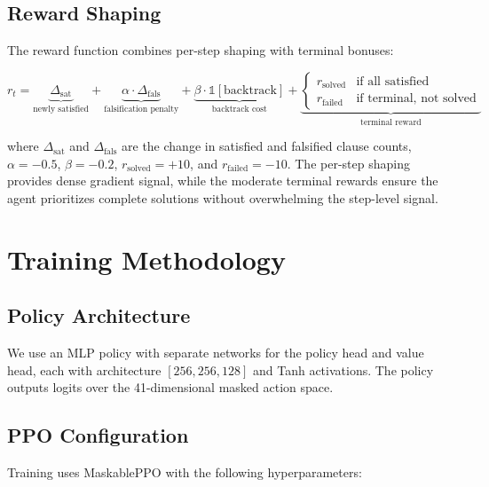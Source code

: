 \documentclass{article}
\begin{document}
\subsection{Reward Shaping}
\label{sec:rewards}

The reward function combines per-step shaping with terminal bonuses:

\begin{equation}
r_t = \underbrace{\Delta_{\text{sat}}}_{\text{newly satisfied}} + \underbrace{\alpha \cdot \Delta_{\text{fals}}}_{\text{falsification penalty}} + \underbrace{\beta \cdot \mathbb{1}[\text{backtrack}]}_{\text{backtrack cost}} + \underbrace{\begin{cases} r_{\text{solved}} & \text{if all satisfied} \\ r_{\text{failed}} & \text{if terminal, not solved} \end{cases}}_{\text{terminal reward}}
\end{equation}

where $\Delta_{\text{sat}}$ and $\Delta_{\text{fals}}$ are the change in satisfied and falsified clause counts, $\alpha = -0.5$, $\beta = -0.2$, $r_{\text{solved}} = +10$, and $r_{\text{failed}} = -10$. The per-step shaping provides dense gradient signal, while the moderate terminal rewards ensure the agent prioritizes complete solutions without overwhelming the step-level signal.

\section{Training Methodology}

\subsection{Policy Architecture}

We use an MLP policy with separate networks for the policy head and value head, each with architecture $[256, 256, 128]$ and Tanh activations. The policy outputs logits over the 41-dimensional masked action space.

\subsection{PPO Configuration}

Training uses MaskablePPO with the following hyperparameters:
\end{document}

